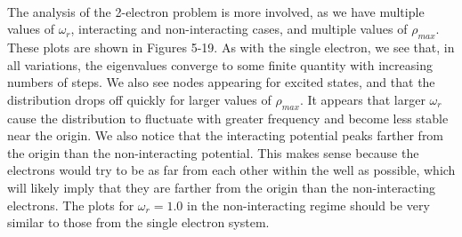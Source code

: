 \documentclass[12pt]{article}
\numberwithin{equation}{section}
\begin{document}
\\\indent The analysis of the 2-electron problem is more involved, as we have multiple values of $\omega_{r}$, interacting and non-interacting cases, and multiple values of $\rho_{max}$.  These plots are shown in Figures 5-19.  As with the single electron, we see that, in all variations, the eigenvalues converge to some finite quantity with increasing numbers of steps.  We also see nodes appearing for excited states, and that the distribution drops off quickly for larger values of $\rho_{max}$.  It appears that larger $\omega_{r}$ cause the distribution to fluctuate with greater frequency and become less stable near the origin.  We also notice that the interacting potential peaks farther from the origin than the non-interacting potential.  This makes sense because the electrons would try to be as far from each other within the well as possible, which will likely imply that they are farther from the origin than the non-interacting electrons.  The plots for $\omega_{r}=1.0$ in the non-interacting regime should be very similar to those from the single electron system.
\end{document}
